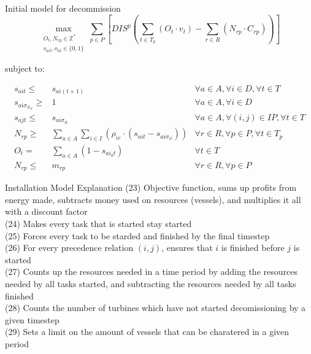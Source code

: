 \documentclass{beamer}
\begin{document}

\begin{frame}{Initial model for decommission}
\scriptsize
\begin{equation}
	\max_{\substack{O_t, N_{rp} \in \mathbb{Z}^* \\ 
	s_{ait}, o_{at} \in \{0, 1\}}} 
	\sum_{p \in P} [ DIS^p (\sum_{t\in T_p} (O_t \cdot v_t)  - \sum_{r\in R} (N_{rp} \cdot C_{rp})) ]
\end{equation}

\bigskip
subject to:

\begin{align}
s_{ait} \leq& s_{ai(t+1)}											&	\forall a \in A, \forall i \in D, \forall t \in T			\\
s_{ai\sigma_{it_N}} \geq& 1										&	\forall a \in A, \forall i \in D						\\
s_{ajt} \leq& s_{ai\sigma_{it}}										&	\forall a \in A, \forall (i, j) \in IP, \forall t \in T 			\\
N_{rp} \geq& \sum_{a \in A}\sum_{i\in I} (\rho_{ir} \cdot (s_{ait} - s_{ai\sigma_{it}}))		& 	\forall r \in R, \forall p \in P, \forall t \in T_p			\\
O_t =&  \sum_{a \in A} (1 - s_{ai_0t} )									& 	\forall t \in T								\\
N_{rp} \leq& m_{rp}											& 	\forall r \in R, \forall p \in P
\end{align}

\end{frame}

\begin{frame}{Installation Model Explanation}
(23) Objective function, sums up profits from energy made, subtracts money used on resources (vessels), and multiplies it all with a discount factor	\\
(24) Makes every task that is started stay started 	\\
(25) Forces every task to be starded and finished by the final timestep	\\
(26) For every precedence relation $(i, j)$, ensures that $i$ is finished before $j$ is started 	\\
(27) Counts up the resources needed in a time period by adding the resources needed by all tasks started, and subtracting the resources needed by all tasks finished	\\
(28) Counts the number of turbines which have not started decomissioning by a given timestep	\\
(29) Sets a limit on the amount of vessels that can be charatered in a given period
\end{frame}
\end{document}
